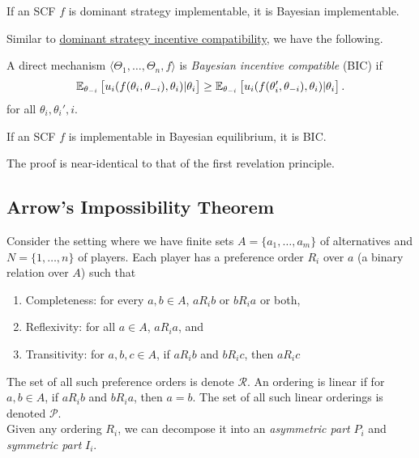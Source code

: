 	\begin{fprop}
		If an SCF $f$ is dominant strategy implementable, it is Bayesian implementable.
	\end{fprop}

	Similar to \hyperref[def: dsic]{dominant strategy incentive compatibility}, we have the following.

	\begin{fdef}
		\label{def: bic}
		A direct mechanism $\langle \Theta_1,\ldots,\Theta_n,f\rangle$ is \emph{Bayesian incentive compatible} (BIC) if
		\begin{equation}
			\label{eqn: dsic}
			\mathbb{E}_{\theta_{-i}} \left[ u_i(f(\theta_i,\theta_{-i}),\theta_i) | \theta_i \right] \ge \mathbb{E}_{\theta_{-i}} \left[ u_i(f(\theta_i',\theta_{-i}),\theta_i) | \theta_i \right].
		\end{equation}
		for all $\theta_i,\theta_i',i$.
	\end{fdef}

	\begin{ftheo}
		If an SCF $f$ is implementable in Bayesian equilibrium, it is BIC.
	\end{ftheo}

	The proof is near-identical to that of the first revelation principle.

\subsection{Arrow's Impossibility Theorem}

	Consider the setting where we have finite sets $A = \{a_1,\ldots,a_m\}$ of alternatives and $N = \{1,\ldots,n\}$ of players. Each player has a preference order $R_i$ over $a$ (a binary relation over $A$) such that
	\begin{enumerate}
		\item Completeness: for every $a,b \in A$, $a R_i b$ or $b R_i a$ or both,
		\item Reflexivity: for all $a \in A$, $a R_i a$, and
		\item Transitivity: for $a,b,c \in A$, if $a R_i b$ and $b R_i c$, then $a R_i c$
	\end{enumerate}
	The set of all such preference orders is denote $\mathcal{R}$. An ordering is linear if for $a,b \in A$, if $aR_i b$ and $bR_i a$, then $a = b$. The set of all such linear orderings is denoted $\mathcal{P}$.\\

	Given any ordering $R_i$, we can decompose it into an \emph{asymmetric part} $P_i$ and \emph{symmetric part} $I_i$.

